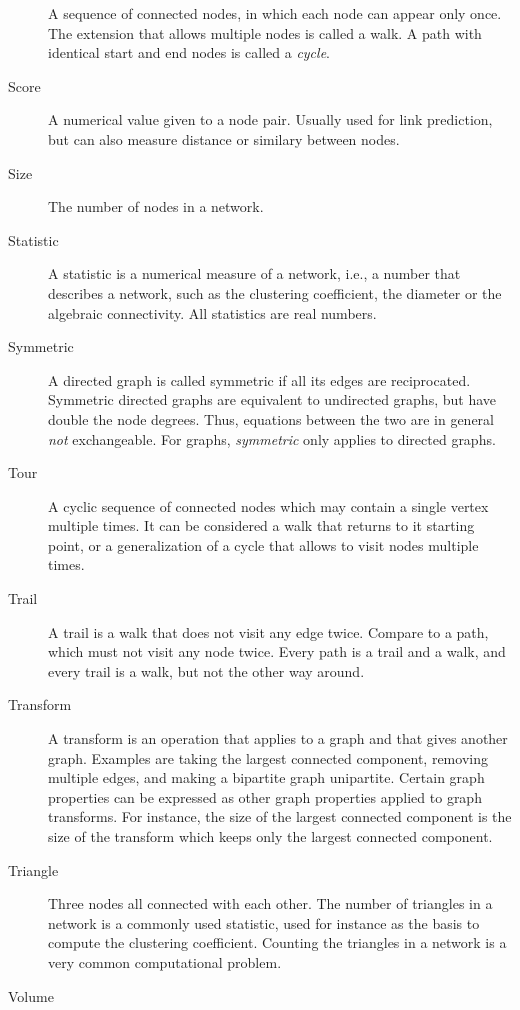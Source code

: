 \documentclass{article}
\begin{document}
\begin{description}
    A sequence of connected nodes, in which each node can appear only
    once.  The extension that allows multiple nodes is called a walk.  A
    path with identical start and end nodes is called a \emph{cycle}. 
  \item[Score]
    A numerical value given to a node pair.  Usually used for link
    prediction, but can also measure distance or similary between
    nodes. 
  \item[Size]
    The number of nodes in a network.  
  \item[Statistic]
    A statistic is a numerical measure of a network, i.e., a number that
    describes a network, such as the clustering coefficient, the
    diameter or the algebraic connectivity.  All statistics are real
    numbers.   
  \item[Symmetric] A directed graph is called symmetric if all its edges
    are reciprocated.  Symmetric directed graphs are equivalent to
    undirected graphs, but have double the node degrees.  Thus,
    equations between the two are in general \emph{not} exchangeable.
    For graphs, \emph{symmetric} only applies to directed graphs. 
  \item[Tour]
    A cyclic sequence of connected nodes which may contain a single
    vertex multiple times.  It can be considered a walk that returns to
    it starting point, or a generalization of a cycle that allows to
    visit nodes multiple times.  
  \item[Trail] A trail is a walk that does not visit any edge twice.
    Compare to a path, which must not visit any node twice.  Every path
    is a trail and a walk, and every trail is a walk, but not the other
    way around. 
  \item[Transform] 
    A transform is an operation that applies to a graph and that gives
    another graph.  Examples are taking the largest connected component,
    removing multiple edges, and making a bipartite graph unipartite.
    Certain graph properties can be expressed as other graph properties
    applied to graph transforms.  For instance, the size of the largest
    connected component is the size of the transform which keeps only
    the largest connected component. 
  \item[Triangle]
    Three nodes all connected with each other.  The number of triangles
    in a network is a commonly used statistic, used for instance as
    the basis to compute the clustering coefficient.  Counting the
    triangles in a network is a very common computational problem.  
  \item[Volume]

\end{description}
\end{document}
